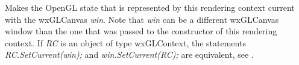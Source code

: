 

\label{wxglcontextsetcurrent}


Makes the OpenGL state that is represented by this rendering context current with the wxGLCanvas {\it win}.
Note that {\it win} can be a different wxGLCanvas window than the one that was passed to the constructor of this rendering context.
If { \it RC } is an object of type wxGLContext, the statements { \it RC.SetCurrent(win); } and { \it win.SetCurrent(RC); } are equivalent,
see .
